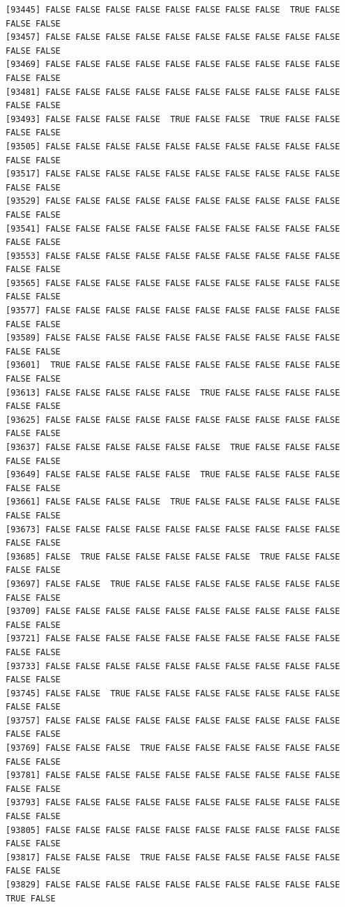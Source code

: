\documentclass[
  a4paper,
  DIV=11,
  numbers=noendperiod]{scrartcl}
\begin{document}
\begin{verbatim}
[93445] FALSE FALSE FALSE FALSE FALSE FALSE FALSE FALSE  TRUE FALSE FALSE FALSE
[93457] FALSE FALSE FALSE FALSE FALSE FALSE FALSE FALSE FALSE FALSE FALSE FALSE
[93469] FALSE FALSE FALSE FALSE FALSE FALSE FALSE FALSE FALSE FALSE FALSE FALSE
[93481] FALSE FALSE FALSE FALSE FALSE FALSE FALSE FALSE FALSE FALSE FALSE FALSE
[93493] FALSE FALSE FALSE FALSE  TRUE FALSE FALSE  TRUE FALSE FALSE FALSE FALSE
[93505] FALSE FALSE FALSE FALSE FALSE FALSE FALSE FALSE FALSE FALSE FALSE FALSE
[93517] FALSE FALSE FALSE FALSE FALSE FALSE FALSE FALSE FALSE FALSE FALSE FALSE
[93529] FALSE FALSE FALSE FALSE FALSE FALSE FALSE FALSE FALSE FALSE FALSE FALSE
[93541] FALSE FALSE FALSE FALSE FALSE FALSE FALSE FALSE FALSE FALSE FALSE FALSE
[93553] FALSE FALSE FALSE FALSE FALSE FALSE FALSE FALSE FALSE FALSE FALSE FALSE
[93565] FALSE FALSE FALSE FALSE FALSE FALSE FALSE FALSE FALSE FALSE FALSE FALSE
[93577] FALSE FALSE FALSE FALSE FALSE FALSE FALSE FALSE FALSE FALSE FALSE FALSE
[93589] FALSE FALSE FALSE FALSE FALSE FALSE FALSE FALSE FALSE FALSE FALSE FALSE
[93601]  TRUE FALSE FALSE FALSE FALSE FALSE FALSE FALSE FALSE FALSE FALSE FALSE
[93613] FALSE FALSE FALSE FALSE FALSE  TRUE FALSE FALSE FALSE FALSE FALSE FALSE
[93625] FALSE FALSE FALSE FALSE FALSE FALSE FALSE FALSE FALSE FALSE FALSE FALSE
[93637] FALSE FALSE FALSE FALSE FALSE FALSE  TRUE FALSE FALSE FALSE FALSE FALSE
[93649] FALSE FALSE FALSE FALSE FALSE  TRUE FALSE FALSE FALSE FALSE FALSE FALSE
[93661] FALSE FALSE FALSE FALSE  TRUE FALSE FALSE FALSE FALSE FALSE FALSE FALSE
[93673] FALSE FALSE FALSE FALSE FALSE FALSE FALSE FALSE FALSE FALSE FALSE FALSE
[93685] FALSE  TRUE FALSE FALSE FALSE FALSE FALSE  TRUE FALSE FALSE FALSE FALSE
[93697] FALSE FALSE  TRUE FALSE FALSE FALSE FALSE FALSE FALSE FALSE FALSE FALSE
[93709] FALSE FALSE FALSE FALSE FALSE FALSE FALSE FALSE FALSE FALSE FALSE FALSE
[93721] FALSE FALSE FALSE FALSE FALSE FALSE FALSE FALSE FALSE FALSE FALSE FALSE
[93733] FALSE FALSE FALSE FALSE FALSE FALSE FALSE FALSE FALSE FALSE FALSE FALSE
[93745] FALSE FALSE  TRUE FALSE FALSE FALSE FALSE FALSE FALSE FALSE FALSE FALSE
[93757] FALSE FALSE FALSE FALSE FALSE FALSE FALSE FALSE FALSE FALSE FALSE FALSE
[93769] FALSE FALSE FALSE  TRUE FALSE FALSE FALSE FALSE FALSE FALSE FALSE FALSE
[93781] FALSE FALSE FALSE FALSE FALSE FALSE FALSE FALSE FALSE FALSE FALSE FALSE
[93793] FALSE FALSE FALSE FALSE FALSE FALSE FALSE FALSE FALSE FALSE FALSE FALSE
[93805] FALSE FALSE FALSE FALSE FALSE FALSE FALSE FALSE FALSE FALSE FALSE FALSE
[93817] FALSE FALSE FALSE  TRUE FALSE FALSE FALSE FALSE FALSE FALSE FALSE FALSE
[93829] FALSE FALSE FALSE FALSE FALSE FALSE FALSE FALSE FALSE FALSE  TRUE FALSE

\end{verbatim}
\end{document}

